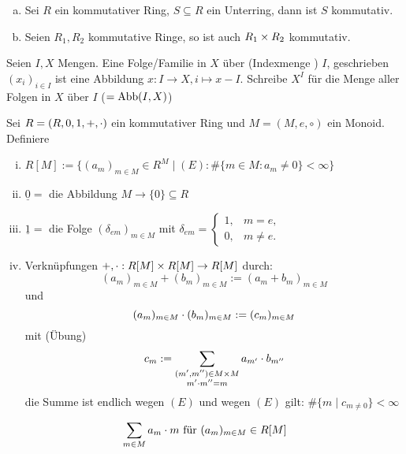 \documentclass[a4paper]{report}
\begin{document}
\begin{bem*}[Übung]\item
  \begin{enumerate}[(a)]
    \item Sei $R$ ein kommutativer Ring, $S \subseteq R$ ein Unterring, dann ist $S$ kommutativ.
    \item Seien $R_{1}, R_{2}$ kommutative Ringe, so ist auch $R_{1} \times R_{2}$ kommutativ.
  \end{enumerate}
\end{bem*}

\begin{whg*}
Seien $I, X$ Mengen. Eine Folge/Familie in $X$ über (Indexmenge ) $I$, geschrieben $(x_{i})_{i \in I}$ ist eine Abbildung $x: I \to X, i \mapsto x-I$. Schreibe $X^{I}$ für die Menge aller Folgen in $X$ über $I$ ($=\operatorname{Abb}(I,X)$)
\end{whg*}

\begin{bsp}
  Sei $R = (R, 0, 1, +, \cdot)$ ein kommutativer Ring und $M = (M, e, \circ)$ ein Monoid. Definiere
  \begin{enumerate}[(i)]
    \item $R[M] := \{(a_{m})_{m \in M} \in R^{M} \mid (E): \# \{m \in M : a_{m} \ne 0\} < \infty\}$
    \item $\underline 0 = $ die Abbildung $M \to \{0\} \subseteq R$
    \item $\underline 1 = $ die Folge $(\delta_{em})_{m \in M}$ mit $\delta_{em} = \begin{cases} 1, & m = e, \\ 0, & m \ne e.\end{cases}$
    \item Verknüpfungen $+, \cdot : R[M] \times R[M] \to R[M]$ durch:
          \[(a_{m})_{m \in M} + (b_{m})_{m \in M} := (a_{m}+b_{m})_{m \in M}\]
          und
          \[(a_{m})_{m \in M} \cdot (b_{m})_{m \in M} := (c_{m})_{m \in M}\]
          mit (Übung)
          \[c_{m}:= \sum_{\substack{(m', m'') \in M \times M \\ m' \cdot m'' = m}}a_{m'} \cdot b_{m''}\]
          die Summe ist endlich wegen $(E)$ und wegen $(E)$ gilt: $\#\{m \mid c_{m \ne 0}\} < \infty$
  \end{enumerate}
\end{bsp}

\begin{nota*}
\[\sum_{m \in M}a_{m} \cdot m \text{ für } (a_{m})_{m \in M} \in R[M]\]
\end{nota*}
\end{document}
